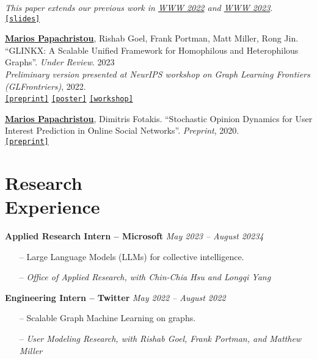 \documentclass[margin]{res}
\newcommand{\specialurl}[2]{\href {#2} {\texttt{[#1]}}}
\newcommand{\preprint}[1]{\specialurl {preprint} {#1}}
\newcommand{\slides}[1]{\specialurl {slides} {#1}}
\newcommand{\poster}[1]{\specialurl {poster} {#1}}
\newcommand{\workshop}[1]{\specialurl {workshop} {#1}}
\newcommand{\authorref}[1]{\underline {\textbf{#1}}}
\newcommand{\authorme}{\authorref{Marios Papachristou}}
\begin{document}
\begin{resume}
\begin{enumerate}[nosep, label={[W\arabic*]}]
   
   \emph{This paper extends our previous work in \href{https://doi.org/10.1145/3485447.3512047}{WWW 2022} and \href{https://arxiv.org/abs/2205.13394}{WWW 2023}}. \\
       \slides{https://drive.google.com/file/d/1DgOCnJ5Pf3Je-F7a-Adiy2TTZ7oZUbbB/view?usp=sharing}  
   \item \authorme, Rishab Goel, Frank Portman, Matt Miller, Rong Jin. ``GLINKX: A Scalable Unified Framework for Homophilous and Heterophilous Graphs''. \emph{Under Review}. 2023 \\\emph{Preliminary version presented at NeurIPS workshop on Graph Learning Frontiers (GLFrontriers)}, 2022. \\ \preprint{https://arxiv.org/abs/2211.00550} \poster{https://drive.google.com/file/d/14LwkvoH7sUe6qGvINGqTuMSHid16J3Av/view?usp=share_link} \workshop{https://openreview.net/forum?id=GlViaJSwnlK}
    \item \authorme, Dimitris Fotakis. ``Stochastic Opinion Dynamics for User Interest Prediction in Online Social Networks''.  \emph{Preprint}, 2020. \\ \preprint{https://www.researchgate.net/publication/353006940_Stochastic_Opinion_Dynamics_for_Interest_Prediction_in_Social_Networks}
\end{enumerate}


\section{Research \\ Experience}

 \textbf{Applied Research Intern -- Microsoft} \hfill \emph{May 2023 -- August 20234}

\begin{itemize}[nosep]
	\item[--] Large Language Models (LLMs) for collective intelligence. 	
	\item[--] \emph{Office of Applied Research, with Chin-Chia Hsu and Longqi Yang}
\end{itemize}


\textbf{Engineering Intern -- Twitter} \hfill \emph{May 2022 -- August 2022}
\begin{itemize}[nosep]
\item[--] Scalable Graph Machine Learning on graphs. 
\item[--] \emph{User Modeling Research, with Rishab Goel, Frank Portman, and Matthew Miller}
\end{itemize}


\end{resume}
\end{document}
